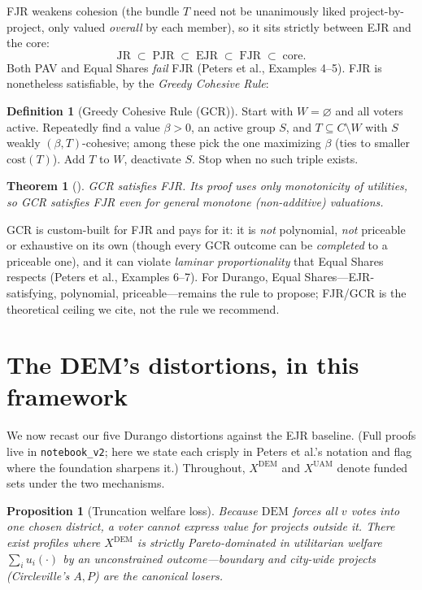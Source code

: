 \documentclass[11pt,letterpaper]{article}
\theoremstyle{definition}
\newtheorem{definition}{Definition}[section]
\theoremstyle{plain}
\newtheorem{theorem}{Theorem}[section]
\newtheorem{proposition}{Proposition}[section]
\theoremstyle{remark}
\newcommand{\projects}{C}          %
\newcommand{\votes}{v}             %
\newcommand{\cost}{\mathrm{cost}}  %
\newcommand{\DEM}{\mathrm{DEM}}
\newcommand{\UAM}{\mathrm{UAM}}
\newcommand{\EJR}{\mathrm{EJR}}
\newcommand{\FJR}{\mathrm{FJR}}
\newcommand{\PJR}{\mathrm{PJR}}
\newcommand{\JRax}{\mathrm{JR}}
\begin{document}
FJR weakens cohesion (the bundle $T$ need not be unanimously liked project-by-project, only valued
\emph{overall} by each member), so it sits strictly between EJR and the core:
\[
  \JRax \;\subset\; \PJR \;\subset\; \EJR \;\subset\; \FJR \;\subset\; \text{core}.
\]
Both PAV and Equal Shares \emph{fail} FJR (Peters et al., Examples 4--5). FJR is nonetheless
satisfiable, by the \emph{Greedy Cohesive Rule}:

\begin{definition}[Greedy Cohesive Rule (GCR)]
Start with $W=\varnothing$ and all voters active. Repeatedly find a value $\beta>0$, an active group
$S$, and $T\subseteq \projects\setminus W$ with $S$ weakly $(\beta,T)$-cohesive; among these pick
the one maximizing $\beta$ (ties to smaller $\cost(T)$). Add $T$ to $W$, deactivate $S$. Stop when
no such triple exists.
\end{definition}

\begin{theorem}[\citealp{peters2021}]
GCR satisfies FJR. Its proof uses only monotonicity of utilities, so GCR satisfies FJR even for
general monotone (non-additive) valuations.
\end{theorem}

\begin{watchout}
GCR is custom-built for FJR and pays for it: it is \emph{not} polynomial, \emph{not} priceable or
exhaustive on its own (though every GCR outcome can be \emph{completed} to a priceable one), and it
can violate \emph{laminar proportionality} that Equal Shares respects (Peters et al., Examples
6--7). For Durango, Equal Shares---EJR-satisfying, polynomial, priceable---remains the rule to
propose; FJR/GCR is the theoretical ceiling we cite, not the rule we recommend.
\end{watchout}

\section{The DEM's distortions, in this framework}
\label{sec:distortions}

We now recast our five Durango distortions against the EJR baseline. (Full proofs live in
\texttt{notebook\_v2}; here we state each crisply in Peters et al.'s notation and flag where the
foundation sharpens it.) Throughout, $X^{\DEM}$ and $X^{\UAM}$ denote funded sets under the two
mechanisms.

\begin{proposition}[Truncation welfare loss]
\label{prop:trunc}
Because $\DEM$ forces all $\votes$ votes into one chosen district, a voter cannot express value for
projects outside it. There exist profiles where $X^{\DEM}$ is strictly Pareto-dominated in
utilitarian welfare $\sum_i u_i(\cdot)$ by an unconstrained outcome---boundary and city-wide
projects (Circleville's $A,P$) are the canonical losers.
\end{proposition}
\end{document}
